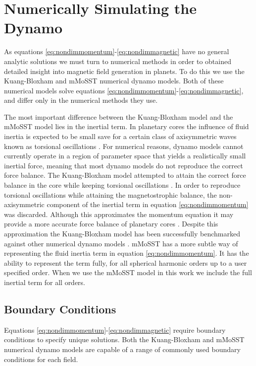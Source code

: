 \section{Numerically Simulating the Dynamo}
As equations \ref{eq:nondimmomentum}-\ref{eq:nondimmagnetic} have no general analytic solutions we must turn to numerical methods in order to obtained detailed insight into magnetic field generation in planets. To do this we use the Kuang-Bloxham \citep{kuangandbloxham1997, kuangandbloxham1999} and mMoSST \citep{jiang2008} numerical dynamo models. Both of these numerical models solve equations \ref{eq:nondimmomentum}-\ref{eq:nondimmagnetic}, and differ only in the numerical methods they use. 

The most important difference between the Kuang-Bloxham model and the mMoSST model lies in the inertial term. In planetary cores the influence of fluid inertia is expected to be small save for a certain class of axisymmetric waves known as torsional oscillations \citep{dumberry2003}. For numerical reasons, dynamo models cannot currently operate in a region of parameter space that yields a realistically small inertial force, meaning that most dynamo models do not reproduce the correct force balance. The Kuang-Bloxham model attempted to attain the correct force balance in the core while keeping torsional oscillations \citep{kuangandbloxham1999}. In order to reproduce torsional oscillations while attaining the magnetostrophic balance, the non-axisymmetric component of the inertial term in equation \ref{eq:nondimmomentum} was discarded. Although this approximates the momentum equation it may provide a more accurate force balance of planetary cores \citep{dumberry2003}. Despite this approximation the Kuang-Bloxham model has been successfully benchmarked against other numerical dynamo models \citep{dharmaraj2013}. mMoSST has a more subtle way of representing the fluid inertia term in equation \ref{eq:nondimmomentum}. It has the ability to represent the term fully, for all spherical harmonic orders up to a user specified order. When we use the mMoSST model in this work we include the full inertial term for all orders.

\subsection{Boundary Conditions}
Equations \ref{eq:nondimmomentum}-\ref{eq:nondimmagnetic} require boundary conditions to specify unique solutions. Both the Kuang-Bloxham and mMoSST numerical dynamo models are capable of a range of commonly used boundary conditions for each field.
